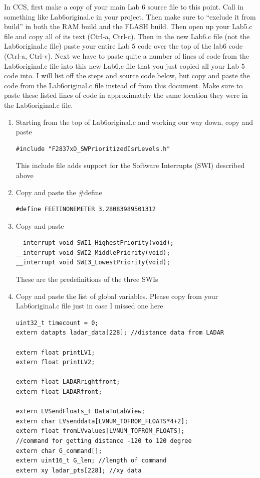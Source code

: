 \documentclass[11pt]{article}
\begin{document}
In CCS, first make a copy of your main Lab 6 source file to this point. Call in something like Lab6original.c in your project. Then make sure to “exclude it from build” in both the RAM build and the FLASH build. Then open up your Lab5.c file and copy all of its text (Ctrl-a, Ctrl-c). Then in the new Lab6.c file (not the Lab6original.c file) paste your entire Lab 5 code over the top of the lab6 code (Ctrl-a, Ctrl-v). Next we have to paste quite a number of lines of code from the Lab6original.c file into this new Lab6.c file that you just copied all your Lab 5 code into. I will list off the steps and source code below, but copy and paste the code from the Lab6original.c file instead of from this document. Make sure to paste these listed lines of code in approximately the same location they were in the Lab6original.c file.
%
\begin{enumerate}
    \item Starting from the top of Lab6original.c and working our way down, copy and paste
\begin{verbatim}
#include "F2837xD_SWPrioritizedIsrLevels.h"
\end{verbatim}
        This include file adds support for the Software Interrupts (SWI) described above
    \item Copy and paste the \#define
\begin{verbatim}
#define FEETINONEMETER 3.28083989501312
\end{verbatim}
    \item Copy and paste
\begin{verbatim}
__interrupt void SWI1_HighestPriority(void);
__interrupt void SWI2_MiddlePriority(void);
__interrupt void SWI3_LowestPriority(void);
\end{verbatim}
        These are the predefinitions of the three SWIs
    \item Copy and paste the list of global variables. Please copy from your Lab6original.c file just in case I missed one here
\begin{verbatim}
uint32_t timecount = 0;
extern datapts ladar_data[228]; //distance data from LADAR

extern float printLV1;
extern float printLV2;

extern float LADARrightfront;
extern float LADARfront;

extern LVSendFloats_t DataToLabView;
extern char LVsenddata[LVNUM_TOFROM_FLOATS*4+2];
extern float fromLVvalues[LVNUM_TOFROM_FLOATS];
//command for getting distance -120 to 120 degree
extern char G_command[];
extern uint16_t G_len; //length of command
extern xy ladar_pts[228]; //xy data


\end{verbatim}
\end{enumerate}
\end{document}
